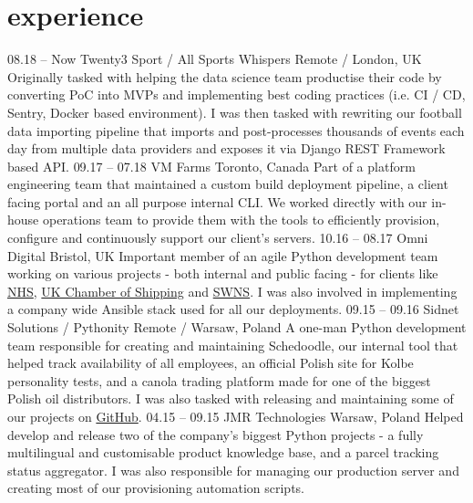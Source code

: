 \documentclass[]{cv-style}          %
\begin{document}
\section{experience}
  \vspace{-0.2cm}

\begin{entrylist}
\entry
  {08.18 -- Now}
  {Twenty3 Sport / All Sports Whispers}
  {Remote / London, UK}
  {Originally tasked with helping the data science team productise their code by converting PoC into MVPs and implementing best coding practices (i.e. CI / CD, Sentry, Docker based environment). I was then tasked with rewriting our football data importing pipeline that imports and post-processes thousands of events each day from multiple data providers and exposes it via Django REST Framework based API.}
\entry
  {09.17 -- 07.18}
  {VM Farms}
  {Toronto, Canada}
  {Part of a platform engineering team that maintained a custom build deployment pipeline, a client facing portal and an all purpose internal CLI. We worked directly with our in-house operations team to provide them with the tools to efficiently provision, configure and continuously support our client's servers.}
\entry
  {10.16 -- 08.17}
  {Omni Digital}
  {Bristol, UK}
  {Important member of an agile Python development team working on various projects - both internal and public facing - for clients like \href{https://www.bristolccg.nhs.uk/}{NHS}, \href{https://www.ukchamberofshipping.com/}{UK Chamber of Shipping} and \href{http://swns.com/}{SWNS}. I was also involved in implementing a company wide Ansible stack used for all our deployments.}
\entry
  {09.15 -- 09.16}
  {Sidnet Solutions / Pythonity}
  {Remote / Warsaw, Poland}
  {A one-man Python development team responsible for creating and maintaining Schedoodle, our internal tool that helped track availability of all employees, an official Polish site for Kolbe personality tests, and a canola trading platform made for one of the biggest Polish oil distributors. I was also tasked with releasing and maintaining some of our projects on \href{https://github.com/Pythonity}{GitHub}.}
\entry
  {04.15 -- 09.15}
  {JMR Technologies}
  {Warsaw, Poland}
  {Helped develop and release two of the company's biggest Python projects - a fully multilingual and customisable product knowledge base, and a parcel tracking status aggregator. I was also responsible for managing our production server and creating most of our provisioning automation scripts.}
\end{entrylist}
\end{document}
